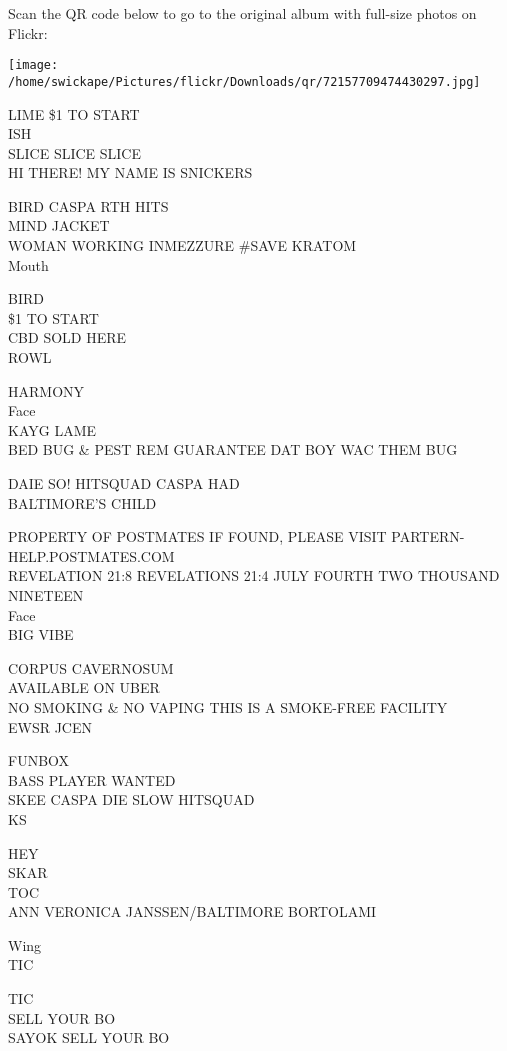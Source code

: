 \documentclass[10pt,letterpaper]{article}
\begin{document}
Scan the QR code below to go to the original album with full-size photos on Flickr:

\texttt{[image: /home/swickape/Pictures/flickr/Downloads/qr/72157709474430297.jpg]}
\pagebreak

LIME \$1 TO START\\
ISH\\
SLICE SLICE SLICE\\
HI THERE!  MY NAME IS SNICKERS

BIRD CASPA RTH HITS\\
MIND JACKET\\
WOMAN WORKING INMEZZURE \#SAVE KRATOM\\
Mouth

BIRD\\
\$1 TO START\\
CBD SOLD HERE\\
ROWL

HARMONY\\
Face\\
KAYG LAME\\
BED BUG \& PEST REM GUARANTEE DAT BOY WAC THEM BUG

DAIE SO! HITSQUAD CASPA HAD\\
BALTIMORE'S CHILD

PROPERTY OF POSTMATES IF FOUND, PLEASE VISIT PARTERN{-}HELP.POSTMATES.COM\\
REVELATION 21:8 REVELATIONS 21:4 JULY FOURTH TWO THOUSAND NINETEEN\\
Face\\
BIG VIBE

CORPUS CAVERNOSUM\\
AVAILABLE ON UBER\\
NO SMOKING \& NO VAPING THIS IS A SMOKE{-}FREE FACILITY\\
EWSR JCEN

FUNBOX\\
BASS PLAYER WANTED\\
SKEE CASPA DIE SLOW HITSQUAD\\
KS

HEY\\
SKAR\\
TOC\\
ANN VERONICA JANSSEN/BALTIMORE BORTOLAMI

Wing\\
TIC

TIC\\
SELL YOUR BO\\
SAYOK SELL YOUR BO
\end{document}
